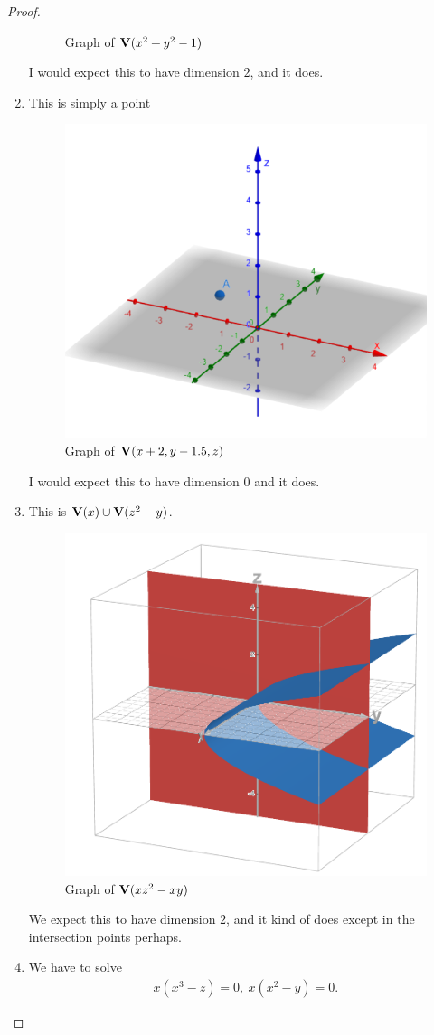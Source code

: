 \begin{proof}
\begin{enumerate}
\begin{figure}[H]
            \caption{Graph of $\mathbf{V}(x^2+y^2-1)$}
            \label{fig:sec1-2-ex4b}
        \end{figure}
        I would expect this to have dimension $2$, and it does.
        \item This is simply a point
        \begin{figure}[H]
            \centering
            \includegraphics[width=0.5\linewidth]{cox-little-oshea/ch1/assets/sec1-2-ex4c.png}
            \caption{Graph of $\mathbf{V}(x+2, y-1.5, z)$}
            \label{fig:sec1-2-ex4c}
        \end{figure}
        I would expect this to have dimension $0$ and it does.
        \item This is $\mathbf{V}(x)\cup \mathbf{V}(z^2 - y)$. 
        \begin{figure}[H]
            \centering
            \includegraphics[width=0.5\linewidth]{cox-little-oshea/ch1/assets/sec1-2-ex4d.png}
            \caption{Graph of $\mathbf{V}(xz^2 - xy)$}
            \label{fig:sec1-2-ex4d}
        \end{figure}
        We expect this to have dimension $2$, and it kind of does except in the intersection points perhaps.
        \item We have to solve
        \begin{align*}
          x(x^3 - z) = 0,~x(x^2 - y) = 0.  
        \end{align*}

\end{enumerate}
\end{proof}
